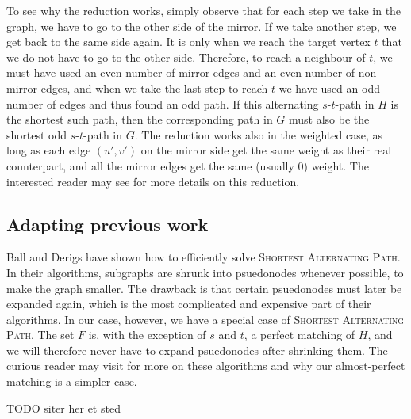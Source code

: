 To see why the reduction works, simply observe that for each step we take in the graph, we have to go to the other side of the mirror. If we take another step, we get back to the same side again. It is only when we reach the target vertex $t$ that we do not have to go to the other side. Therefore, to reach a neighbour of $t$, we must have used an even number of mirror edges and an even number of non-mirror edges, and when we take the last step to reach $t$ we have used an odd number of edges and thus found an odd path. If this alternating $s$-$t$-path in $H$ is the shortest such path, then the corresponding path in $G$ must also be the shortest odd $s$-$t$-path in $G$. The reduction works also in the weighted case, as long as each edge $(u',v')$ on the mirror side get the same weight as their real counterpart, and all the mirror edges get the same (usually 0) weight. The interested reader may see \cite{derigs_shortest_odd_path} for more details on this reduction.

\subsection{Adapting previous work}
Ball and Derigs \cite{shortest_alternating_path} have shown how to efficiently solve \textsc{Shortest Alternating Path}. In their algorithms, subgraphs are shrunk into psuedonodes whenever possible, to make the graph smaller. The drawback is that certain psuedonodes must later be expanded again, which is the most complicated and expensive part of their algorithms. In our case, however, we have a special case of \textsc{Shortest Alternating Path}. The set $F$ is, with the exception of $s$ and $t$, a perfect matching of $H$, and we will therefore never have to expand psuedonodes after shrinking them. The curious reader may visit \cite{shortest_alternating_path} for more on these algorithms and why our almost-perfect matching is a simpler case.

TODO siter \cite{blossom} her et sted



